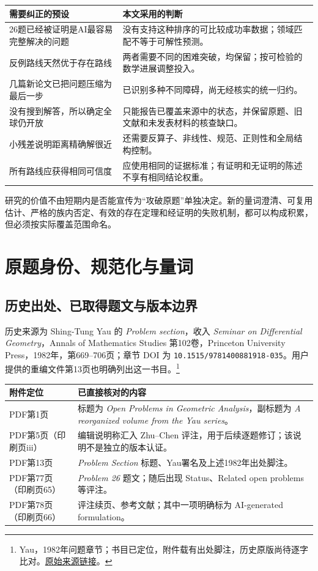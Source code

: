 \documentclass[11pt,a4paper]{article}
\theoremstyle{definition}
\newcommand{\src}[3]{\footnote{\raggedright #1，#2。\href{#3}{原始来源链接}。}}
\begin{document}
\begin{longtable}{P{0.25\textwidth}P{0.68\textwidth}}
\toprule
需要纠正的预设 & 本文采用的判断\\\midrule
26题已经被证明是AI最容易完整解决的问题 & 没有支持这种排序的可比较成功率数据；领域匹配不等于可解性预测。\\
反例路线天然优于存在路线 & 两者需要不同的困难突破，均保留；按可检验的数学进展调整投入。\\
几篇新论文已把问题压缩为最后一步 & 已识别多种不同障碍，尚无经核实的统一归约。\\
没有搜到解答，所以确定全球仍开放 & 只能报告已覆盖来源中的状态，并保留原题、旧文献和未发表材料的核查缺口。\\
小残差说明距离精确解很近 & 还需要反算子、非线性、规范、正则性和全局结构控制。\\
所有路线应获得相同可信度 & 应使用相同的证据标准；有证明和无证明的陈述不享有相同结论权重。\\\bottomrule
\end{longtable}

研究的价值不由短期内是否能宣传为“攻破原题”单独决定。新的量词澄清、可复用估计、严格的族内否定、有效的存在定理和经证明的失败机制，都可以构成积累，但必须按实际覆盖范围命名。

\section{原题身份、规范化与量词}\label{sec:definition}

\subsection{历史出处、已取得题文与版本边界}

历史来源为 Shing-Tung Yau 的 \emph{Problem section}，收入 \emph{Seminar on Differential Geometry}，Annals of Mathematics Studies 第102卷，Princeton University Press，1982年，第669--706页；章节 DOI 为 \texttt{10.1515/9781400881918-035}。用户提供的重编文件第13页也明确列出这一书目。\src{Yau}{1982年问题章节；书目已定位，附件载有出处脚注，历史原版尚待逐字比对}{https://doi.org/10.1515/9781400881918-035}

\begin{longtable}{P{0.24\textwidth}P{0.69\textwidth}}
\toprule
附件定位 & 已直接核对的内容\\\midrule
PDF第1页 & 标题为 \emph{Open Problems in Geometric Analysis}，副标题为 \emph{A reorganized volume from the Yau series}。\\
PDF第5页（印刷页iii） & 编辑说明称汇入 Zhu--Chen 评注，用于后续逐题修订；该说明不是独立的版本认证。\\
PDF第13页 & \emph{Problem Section} 标题、Yau署名及上述1982年出处脚注。\\
PDF第77页（印刷页65） & \emph{Problem 26} 题文；随后出现 Status、Related open problems 等评注。\\
PDF第78页（印刷页66） & 评注续页、参考文献；其中一项明确标为 AI-generated formulation。\\\bottomrule
\end{longtable}
\end{document}
